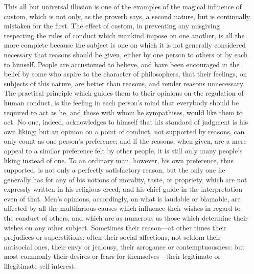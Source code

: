 \documentclass[11pt,openany]{book}
\begin{document}
This all but universal illusion is one of the examples of the magical influence of custom, which is not only, as the proverb says, a second nature, but is continually mistaken for the first. The effect of custom, in preventing any misgiving respecting the rules of conduct which mankind impose on one another, is all the more complete because the subject is one on which it is not generally considered necessary that reasons should be given, either by one person to others or by each to himself. People are accustomed to believe, and have been encouraged in the belief by some who aspire to the character of philosophers, that their feelings, on subjects of this nature, are better than reasons, and render reasons unnecessary. The practical principle which guides them to their opinions on the regulation of human conduct, is the feeling in each person's mind that everybody should be required to act as he, and those with whom he sympathises, would like them to act. No one, indeed, acknowledges to himself that his standard of judgment is his own liking; but an opinion on a point of conduct, not supported by reasons, can only count as one person's preference; and if the reasons, when given, are a mere appeal to a similar preference felt by other people, it is still only many people's liking instead of one. To an ordinary man, however, his own preference, thus supported, is not only a perfectly satisfactory reason, but the only one he generally has for any of his notions of morality, taste, or propriety, which are not expressly written in his religious creed; and his chief guide in the interpretation even of that. Men's opinions, accordingly, on what is laudable or blamable, are affected by all the multifarious causes which influence their wishes in regard to the conduct of others, and which are as numerous as those which determine their wishes on any other subject. Sometimes their reason---at other times their prejudices or superstitions: often their social affections, not seldom their antisocial ones, their envy or jealousy, their arrogance or contemptuousness: but most commonly their desires or fears for themselves---their legitimate or illegitimate self-interest.
\end{document}
